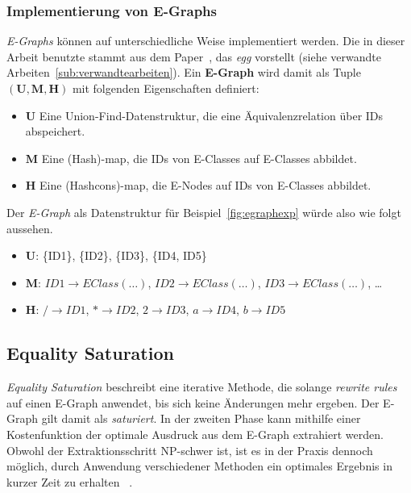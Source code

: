\subsubsection{Implementierung von E-Graphs}

\textit{E-Graphs} können auf unterschiedliche Weise implementiert werden. Die in dieser Arbeit benutzte stammt aus dem Paper~\cite{2021-egg}, das \textit{egg} vorstellt 
(siehe verwandte Arbeiten~\ref{sub:verwandtearbeiten}). Ein \textbf{E-Graph} wird damit als Tuple $(\mathbf{U}, \mathbf{M}, \mathbf{H})$ mit folgenden Eigenschaften definiert:

\begin{itemize}
  \item $\mathbf{U}$ Eine Union-Find-Datenstruktur, die eine Äquivalenzrelation über IDs abspeichert.
  \item $\mathbf{M}$ Eine (Hash)-map, die IDs von E-Classes auf E-Classes abbildet. 
  \item $\mathbf{H}$ Eine (Hashcons)-map, die E-Nodes auf IDs von E-Classes abbildet.
\end{itemize}

Der \textit{E-Graph} als Datenstruktur für Beispiel~\ref{fig:egraphexp} würde also wie folgt aussehen.

\begin{itemize}
  \item $\mathbf{U}$: \{ID1\}, \{ID2\}, \{ID3\}, \{ID4, ID5\} 
  \item $\mathbf{M}$: $ID1 \rightarrow EClass(\ldots)$, $ID2 \rightarrow EClass(\ldots)$, $ID3 \rightarrow EClass(\ldots)$, \ldots 
  \item $\mathbf{H}$: $/ \rightarrow ID1$, $* \rightarrow ID2$, $2 \rightarrow ID3$, $a \rightarrow ID4$, $b \rightarrow ID5$
\end{itemize}



\subsection{Equality Saturation}

\textit{Equality Saturation} beschreibt eine iterative Methode, die solange \textit{rewrite rules} auf einen E-Graph anwendet, bis sich keine Änderungen mehr ergeben. 
Der E-Graph gilt damit als \textit{saturiert}.
In der zweiten Phase kann mithilfe einer Kostenfunktion der optimale Ausdruck aus dem E-Graph extrahiert werden.
Obwohl der Extraktionsschritt NP-schwer ist, ist es in der Praxis dennoch möglich, durch Anwendung verschiedener Methoden ein optimales Ergebnis in kurzer Zeit zu erhalten
~\cite{phaseorder-2009}. 


